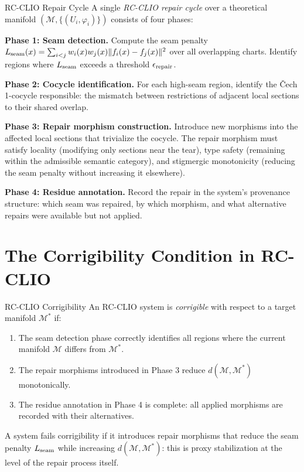 \begin{definition}{RC-CLIO Repair Cycle}
A single \emph{RC-CLIO repair cycle} over a theoretical manifold
$(\mathcal{M}, \{(U_i, \varphi_i)\})$ consists of four phases:

\textbf{Phase 1: Seam detection.} Compute the seam penalty
$L_{\rm seam}(x) = \sum_{i < j} w_i(x)w_j(x)\|f_i(x) - f_j(x)\|^2$
over all overlapping charts. Identify regions where $L_{\rm seam}$ exceeds
a threshold $\epsilon_{\rm repair}$.

\textbf{Phase 2: Cocycle identification.} For each high-seam region, identify
the Čech 1-cocycle responsible: the mismatch between restrictions of adjacent
local sections to their shared overlap.

\textbf{Phase 3: Repair morphism construction.} Introduce new morphisms into
the affected local sections that trivialize the cocycle. The repair morphism
must satisfy locality (modifying only sections near the tear), type safety
(remaining within the admissible semantic category), and stigmergic monotonicity
(reducing the seam penalty without increasing it elsewhere).

\textbf{Phase 4: Residue annotation.} Record the repair in the system's
provenance structure: which seam was repaired, by which morphism, and what
alternative repairs were available but not applied.
\end{definition}

\section{The Corrigibility Condition in RC-CLIO}

\begin{definition}{RC-CLIO Corrigibility}
An RC-CLIO system is \emph{corrigible} with respect to a target manifold
$\mathcal{M}^*$ if:
\begin{enumerate}
  \item The seam detection phase correctly identifies all regions where the
    current manifold $\mathcal{M}$ differs from $\mathcal{M}^*$.
  \item The repair morphisms introduced in Phase 3 reduce $d(\mathcal{M},
    \mathcal{M}^*)$ monotonically.
  \item The residue annotation in Phase 4 is complete: all applied morphisms
    are recorded with their alternatives.
\end{enumerate}
A system fails corrigibility if it introduces repair morphisms that reduce the
seam penalty $L_{\rm seam}$ while increasing $d(\mathcal{M}, \mathcal{M}^*)$:
this is proxy stabilization at the level of the repair process itself.
\end{definition}

